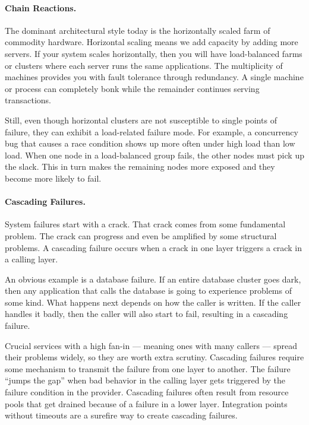 \paragraph{Chain Reactions.} The dominant architectural style today is the horizontally scaled farm of commodity hardware. Horizontal scaling means we add capacity by adding more servers. If your system scales horizontally, then you will have load-balanced farms or clusters where each server runs the same applications. The multiplicity of machines provides you with fault tolerance through redundancy. A single machine or process can completely bonk while the remainder continues serving transactions.

Still, even though horizontal clusters are not susceptible to single points of failure, they can exhibit a load-related failure mode. For example, a concurrency bug that causes a race condition shows up more often under high load than low load. When one node in a load-balanced group fails, the other nodes must pick up the slack. This in turn makes the remaining nodes more exposed and they become more likely to fail.

\paragraph{Cascading Failures.} System failures start with a crack. That crack comes from some fundamental problem. The crack can progress and even be amplified by some structural problems. A cascading failure occurs when a crack in one layer triggers a crack in a calling layer.

An obvious example is a database failure. If an entire database cluster goes dark, then any application that calls the database is going to experience problems of some kind. What happens next depends on how the caller is written. If the caller handles it badly, then the caller will also start to fail, resulting in a cascading failure.

Crucial services with a high fan-in — meaning ones with many callers — spread their problems widely, so they are worth extra scrutiny. Cascading failures require some mechanism to transmit the failure from one layer to another. The failure “jumps the gap” when bad behavior in the calling layer gets triggered by the failure condition in the provider. Cascading failures often result from resource pools that get drained because of a failure in a lower layer. Integration points without timeouts are a surefire way to create cascading failures.

